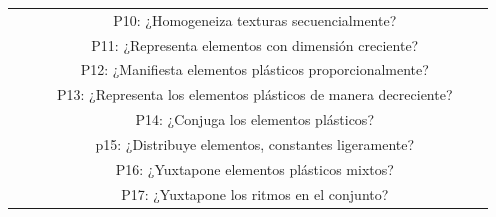 \documentclass[12pt,a4paper]{article}
\begin{document}
\begin{landscape}
\begin{table}[ht!]
\begin{tabular}{cccccc}
				&&& 
				P10: ¿Homogeneiza texturas secuencialmente?      &\\\cline{2-4} 			&
				\multirow{7}{*}{\dimddd} 			& 
				\multirow{2}{*}{\fbbbbbbb} 			&
				P11: ¿Representa elementos con dimensión creciente?\\ \cline{4-4}	
				&&&
				P12: ¿Manifiesta elementos plásticos proporcionalmente?     &\\\cline{3-4}&&
				\multirow{1}{*}{\fbbbbbbbb} 			&
				P13: ¿Representa los elementos plásticos de manera decreciente?\\\cline{3-4}&&
				\multirow{2}{*}{\fbbbbbbbb} 			&
				P14: ¿Conjuga los elementos plásticos?\\\cline{4-4}	
				&&& p15: ¿Distribuye elementos, constantes ligeramente?       &\\\cline{3-4} 			&&
				\multirow{2}{*}{\fbbbbbbbbb} 			&
				P16: ¿Yuxtapone elementos plásticos mixtos?\\\cline{4-4}	
				&&& P17: ¿Yuxtapone los ritmos en el conjunto?      &\\	\hline	\end{tabular}
		\end{table}
\end{landscape}
\end{document}
